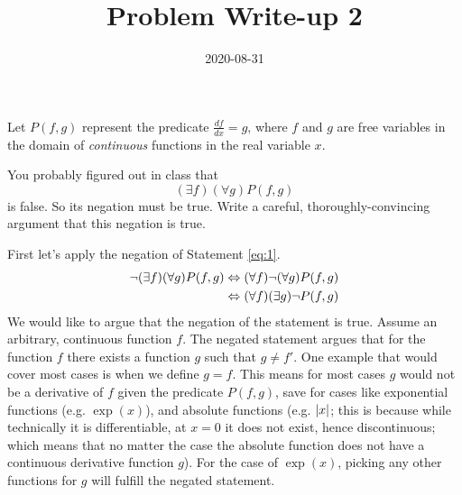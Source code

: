 \documentclass[12pt,a4paper]{article}
\title{Problem Write-up 2}
\date{2020-08-31}
\begin{document}
    \begin{problem}
        Let \(P(f,g)\) represent the predicate \(\frac{df}{dx} = g\text{,}\) where \(f\) and \(g\) are free variables in the domain of \emph{continuous} functions in the real variable \(x\).

        You probably figured out in class that 
        \begin{equation} \label{eq:1}
        	(\exists f)(\forall g) P(f,g)
        \end{equation}
         is false. So its negation must be true. Write a careful, thoroughly-convincing argument that this negation is true.
    \end{problem}
    
    \begin{answer}
        First let's apply the negation of Statement \ref{eq:1}.
        \begin{align*}
        	\neg (\exists f)(\forall g) P(f,g) &\Leftrightarrow (\forall f) \neg (\forall g) P(f,g) \\
        	&\Leftrightarrow (\forall  f) (\exists g) \neg P(f,g)
        \end{align*}
        We would like to argue that the negation of the statement is true. Assume an arbitrary, continuous function \(f\). 
        The negated statement argues that for the function \(f\) there exists a function \(g\) such that \(g \neq f'\). 
        One example that would cover most cases is when we define \(g = f\). 
        This means for most cases \(g\) would not be a derivative of \(f\) given the predicate \(P(f,g)\), save for cases like exponential functions (e.g. \(\exp{(x)}\)), and absolute functions (e.g. \(\left\lvert x \right\rvert\); this is because while technically it is differentiable, at \(x = 0\) it does not exist, hence discontinuous; which means that no matter the case the absolute function does not have a continuous derivative function \(g\)). 
        For the case of \(\exp{(x)}\), picking any other functions for \(g\) will fulfill the negated statement.
    \end{answer}
\end{document}
